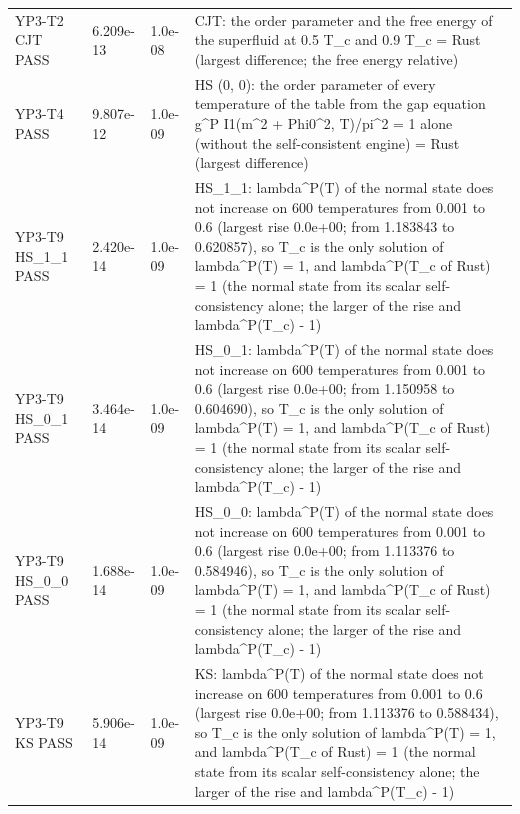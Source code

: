 \documentclass[aps,prd,onecolumn,superscriptaddress,nofootinbib,floatfix,longbibliography]{revtex4-2}
\begin{document}
\begin{longtable}{p{}p{}p{}p{}}
YP3-T2 CJT \newline PASS & 6.209e-13 & 1.0e-08 & CJT: the order parameter and the free energy of the superfluid at 0.5 T\_c and 0.9 T\_c = Rust (largest difference; the free energy relative) \\
YP3-T4 \newline PASS & 9.807e-12 & 1.0e-09 & HS (0, 0): the order parameter of every temperature of the table from the gap equation g\textasciicircum{}P I1(m\textasciicircum{}2 + Phi0\textasciicircum{}2, T)/pi\textasciicircum{}2 = 1 alone (without the self-consistent engine) = Rust (largest difference) \\
YP3-T9 HS\_1\_1 \newline PASS & 2.420e-14 & 1.0e-09 & HS\_1\_1: lambda\textasciicircum{}P(T) of the normal state does not increase on 600 temperatures from 0.001 to 0.6 (largest rise 0.0e+00; from 1.183843 to 0.620857), so T\_c is the only solution of lambda\textasciicircum{}P(T) = 1, and lambda\textasciicircum{}P(T\_c of Rust) = 1 (the normal state from its scalar self-consistency alone; the larger of the rise and \textbar{}lambda\textasciicircum{}P(T\_c) - 1\textbar{}) \\
YP3-T9 HS\_0\_1 \newline PASS & 3.464e-14 & 1.0e-09 & HS\_0\_1: lambda\textasciicircum{}P(T) of the normal state does not increase on 600 temperatures from 0.001 to 0.6 (largest rise 0.0e+00; from 1.150958 to 0.604690), so T\_c is the only solution of lambda\textasciicircum{}P(T) = 1, and lambda\textasciicircum{}P(T\_c of Rust) = 1 (the normal state from its scalar self-consistency alone; the larger of the rise and \textbar{}lambda\textasciicircum{}P(T\_c) - 1\textbar{}) \\
YP3-T9 HS\_0\_0 \newline PASS & 1.688e-14 & 1.0e-09 & HS\_0\_0: lambda\textasciicircum{}P(T) of the normal state does not increase on 600 temperatures from 0.001 to 0.6 (largest rise 0.0e+00; from 1.113376 to 0.584946), so T\_c is the only solution of lambda\textasciicircum{}P(T) = 1, and lambda\textasciicircum{}P(T\_c of Rust) = 1 (the normal state from its scalar self-consistency alone; the larger of the rise and \textbar{}lambda\textasciicircum{}P(T\_c) - 1\textbar{}) \\
YP3-T9 KS \newline PASS & 5.906e-14 & 1.0e-09 & KS: lambda\textasciicircum{}P(T) of the normal state does not increase on 600 temperatures from 0.001 to 0.6 (largest rise 0.0e+00; from 1.113376 to 0.588434), so T\_c is the only solution of lambda\textasciicircum{}P(T) = 1, and lambda\textasciicircum{}P(T\_c of Rust) = 1 (the normal state from its scalar self-consistency alone; the larger of the rise and \textbar{}lambda\textasciicircum{}P(T\_c) - 1\textbar{}) \\

\end{longtable}
\end{document}
